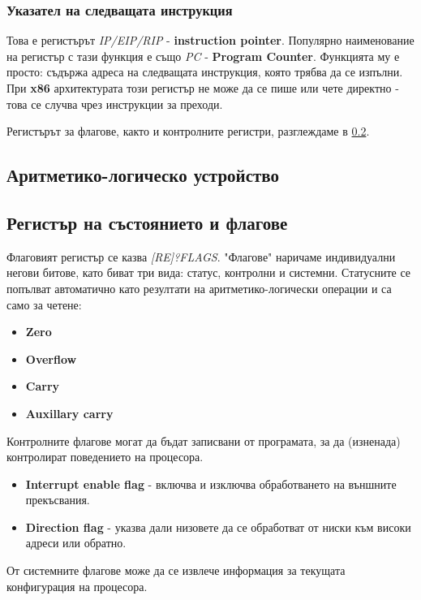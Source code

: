 \documentclass[fleqn,12pt]{article}
\begin{document}
\subsubsection{Указател на следващата инструкция}
Това е регистърът \textit{IP/EIP/RIP} - \textbf{instruction pointer}. Популярно наименование на регистър с тази функция е също 
\textit{PC} - \textbf{Program Counter}. Функцията му е просто: съдържа адреса на следващата инструкция, която трябва да се изпълни.
При \textbf{x86} архитектурата този регистър не може да се пише или чете директно - това се случва чрез инструкции за преходи.

Регистърът за флагове, както и контролните регистри, разглеждаме в \ref{section:flags}.

\subsection{Аритметико-логическо устройство}

\subsection{Регистър на състоянието и флагове}
\label{section:flags}
Флаговият регистър се казва \textit{[RE]?FLAGS}. "Флагове" наричаме индивидуални негови битове, като биват три вида: статус, контролни и системни.
Статусните се попълват автоматично като резултати на аритметико-логически операции и са само за четене:
\begin{itemize}
    \item \textbf{Zero}
    \item \textbf{Overflow}
    \item \textbf{Carry}
    \item \textbf{Auxillary carry}
\end{itemize}

Контролните флагове могат да бъдат записвани от програмата, за да (изненада) контролират поведението на процесора.
\begin{itemize}
    \item \textbf{Interrupt enable flag} - включва и изключва обработването на външните прекъсвания.
    \item \textbf{Direction flag} - указва дали низовете да се обработват от ниски към високи адреси или обратно.
\end{itemize}

От системните флагове може да се извлече информация за текущата конфигурация на процесора.
\end{document}
